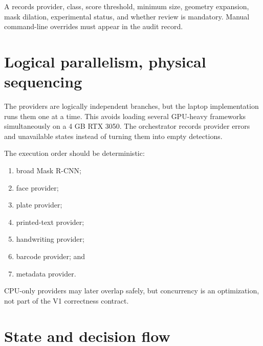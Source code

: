 A  records provider, class, score threshold, minimum size, geometry expansion, mask dilation, experimental status, and whether review is mandatory. Manual command-line overrides must appear in the audit record.

\section{Logical parallelism, physical sequencing}

The providers are logically independent branches, but the laptop implementation runs them one at a time. This avoids loading several GPU-heavy frameworks simultaneously on a 4 GB RTX 3050. The orchestrator records provider errors and unavailable states instead of turning them into empty detections.

The execution order should be deterministic:

\begin{enumerate}[leftmargin=7mm]
  \item broad Mask R-CNN;
  \item face provider;
  \item plate provider;
  \item printed-text provider;
  \item handwriting provider;
  \item barcode provider; and
  \item metadata provider.
\end{enumerate}

CPU-only providers may later overlap safely, but concurrency is an optimization, not part of the V1 correctness contract.

\section{State and decision flow}

